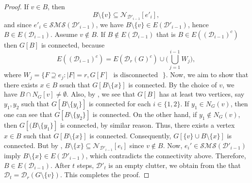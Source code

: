 \documentclass[12pt,reqno]{amsart}
\theoremstyle{definition}
\def\N{\mathcal{N}}
\def\D{\mathcal{D}}
\def\SMS{\mathcal{SMS}}
\begin{document}
\begin{proof}
If $v \in B$, then 
\[
B\setminus\{v\} \subseteq \N_{\D'_{i-1}}[e'_i],
\]
and since $e'_i \in \SMS(\D'_{i-1})$, we have $B\setminus\{v\}\in E(\D'_{i-1})$, hence $B\in E(\D_{i-1})$. 
Assume $v \notin B$. If $B \notin E(\D_{i-1})$ that is $B \in E((\D_{i-1})^c)$ then $G[B]$ is connected, because \[E((\D_{i-1})^c) = E({\D_r(G)}^c) \cup \big(\bigcup\limits_{j=1}^{i-1} W_j \big),\] where $W_j = \{F \supseteq e_j : |F|=r, G[F] \text{~ is disconnected ~} \}$.
Now, we aim to show that there exists $x \in B$ ssuch that $G[B \setminus \{x\}]$ is connected. 
By the choice of $v$, we have $B \cap N_G[v] \neq \emptyset$. 
Also, by , we see that $G[B]$ has at least two vertices, say $y_1,y_2$ such that $G[B \setminus\{y_i\}]$ is connected for each $i\in\{1,2\}$. If $y_1\in N_G(v)$, then one can see that $G[B \setminus \{y_2\}]$ is connected. On the other hand, if $y_1 \notin N_G(v)$, then  $G[(B \setminus \{y_1\}]$ is connected, by similar reason. Thus, there exists a vertex $x \in B$ such that $G[B \setminus \{x\}]$ is connected. Consequently, $G[\{v\} \cup B \setminus \{x\}]$ is connected. 
But by , $B \setminus \{x\} \subseteq \N_{\D'_{i-1}}[e_i]$ since $v \notin B$. Now,  $e_i' \in \SMS(\D'_{i-1})$ imply $B \setminus \{x\} \in E(\D'_{i-1})$, which contradicts the connectivity above. Therefore, $B \in E(\D_{i-1})$. After $t$ steps, $\D'_t$ is an empty clutter, we obtain from the  that $\D_t = \D_r(G\setminus \{v\})$.
This completes the proof.
\end{proof}
\end{document}
